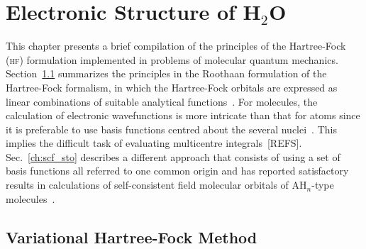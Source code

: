 \chapter{Electronic Structure of H$_{2}$O}
\label{cha:scf_h2o}





This chapter presents a brief compilation of the principles of the
Hartree-Fock (\textsc{hf}) formulation implemented in problems of
molecular quantum mechanics. Section~\ref{ch:var_hf} summarizes the
principles in the Roothaan formulation of the Hartree-Fock formalism,
in which the Hartree-Fock orbitals are expressed as linear
combinations of suitable analytical functions~\cite{Roothaan_HF}. For
molecules, the calculation of electronic wavefunctions is more
intricate than that for atoms since it is preferable to use basis
functions centred about the several
nuclei~\cite{Pitzer_1968,Pitzer_1970}. This implies the difficult task
of evaluating multicentre integrals~[REFS]. Sec.~\ref{ch:scf_sto}
describes a different approach that consists of using a set of basis
functions all referred to one common origin and has reported
satisfactory results in calculations of self-consistent field
molecular orbitals of AH$_{n}$-type molecules~\cite{Moccia_JCP_2164,
  Moccia_1964}.


\section{Variational Hartree-Fock Method}
\label{ch:var_hf}






